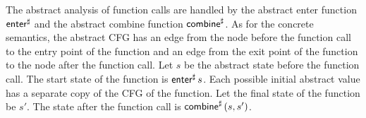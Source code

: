 The abstract analysis of function calls are handled by the abstract enter function $\textsf{enter}^\sharp$ and the abstract combine function $\textsf{combine}^\sharp$.
As for the concrete semantics, the abstract CFG has an edge from the node before the function call to the entry point of the function and an edge from the exit point of the function to the node after the function call.
Let $s$ be the abstract state before the function call.
The start state of the function is $\textsf{enter}^\sharp\,s$.
Each possible initial abstract value has a separate copy of the CFG of the function.
Let the final state of the function be $s'$.
The state after the function call is $\textsf{combine}^\sharp\,(s,s')$.


